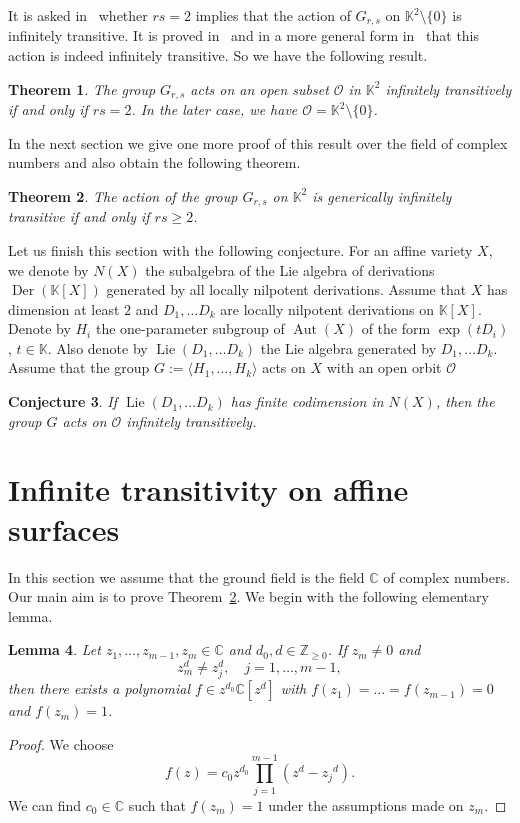 \documentclass[a4paper,draft,reqno,12pt]{amsart}
\newtheorem{theorem}{Theorem}
\newtheorem{conjecture}[theorem]{Conjecture}
\newtheorem{lemma}[theorem]{Lemma}
\theoremstyle{definition}
\theoremstyle{remark}
\DeclareMathOperator{\lie}{Lie}
\DeclareMathOperator{\Aut}{Aut}
\DeclareMathOperator{\Der}{Der}
\def\CC{{\mathbb C}}
\def\KK{{\mathbb K}}
\def\ZZ{{\mathbb Z}}
\def\OOO{\mathcal{O}}
\renewcommand{\ge}{\geqslant}
\begin{document}
It is asked in~\cite[Section~5.1]{AKZ} whether $rs=2$ implies that the action of $G_{r,s}$ on $\KK^2\setminus\{0\}$ is infinitely transitive. It is proved in~\cite[Corollary~21]{LPS} and in a more general form in~\cite[Theorem~1]{CT} that this action is indeed infinitely transitive. So we have the following result.

\begin{theorem} \label{teor2}
The group $G_{r,s}$ acts on an open subset $\OOO$ in $\KK^2$ infinitely transitively if and only if $rs=2$. In the later case, we have $\OOO=\KK^2\setminus\{0\}$. 
\end{theorem}

In the next section we give one more proof of this result over the field of complex numbers and also obtain the following theorem. 

\begin{theorem} \label{geninftra}
The action of the group $G_{r,s}$ on $\KK^2$ is generically infinitely transitive if and only if $rs\ge 2$.
\end{theorem}

Let us finish this section with the following conjecture.  For an affine variety $X$, we denote by $N(X)$ the subalgebra of the Lie algebra of derivations $\Der(\KK[X])$ generated by all locally nilpotent derivations. Assume that $X$ has dimension at least $2$ and $D_1,\ldots D_k$ are locally nilpotent derivations on $\KK[X]$. Denote by $H_i$ the one-parameter subgroup of $\Aut(X)$ of the form $\exp(tD_i)$, $t\in\KK$. Also denote by $\lie(D_1,\ldots D_k)$ the Lie algebra generated by $D_1,\ldots D_k$. Assume that the group $G:=\langle H_1,\ldots, H_k\rangle$ acts on $X$ with an open orbit $\OOO$

\begin{conjecture}
If $\lie(D_1,\ldots D_k)$ has finite codimension in $N(X)$, then the group $G$ acts on $\OOO$ infinitely transitively. 
\end{conjecture} 

\section{Infinite transitivity on affine surfaces}
\label{sec4}

In this section we assume that the ground field is the field $\CC$ of complex numbers.  Our main aim is to prove Theorem~\ref{geninftra}.
We begin with the following elementary lemma.
\begin{lemma}
\label{lem-interpolate}
Let $z_1, \dots, z_{m-1}, z_m \in \CC$ and $d_0, d \in \ZZ_{\ge 0}$. If $z_m \neq 0$ and 
$$
z^d_m \neq z^d_j, \quad j = 1,\dots, m-1,
$$
then there exists a polynomial $f \in z^{d_0} \CC[z^d]$ with $f(z_1) = \dots = f(z_{m-1}) = 0$ and $f(z_{m}) = 1$.
\end{lemma}
\begin{proof}
We choose 
$$
f(z) = c_0 z^{d_0} \prod_{j=1}^{m-1} (z^d - {z_j}^d).
$$
We can find $c_0 \in \CC$ such that $f(z_{m}) = 1$ under the assumptions made on $z_{m}$.
\end{proof}
\end{document}
